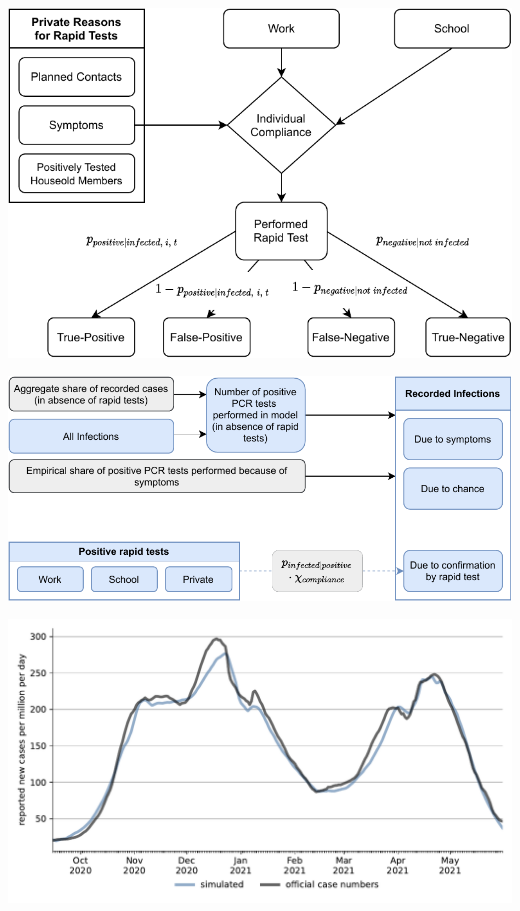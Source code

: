 \documentclass[11pt]{beamer}
\begin{document}
\begin{frame}
    \centering
    \includegraphics[width=\textwidth]{figures/model-graph-bottom-left}
\end{frame}


\begin{frame}
    \centering
    \includegraphics[width=\textwidth]{figures/model-graph-bottom-right}
\end{frame}


\begin{frame}
    \centering
    \includegraphics[width=\textwidth]{figures/results/figures/scenario_comparisons/combined_fit/full_new_known_case}
\end{frame}
\end{document}
